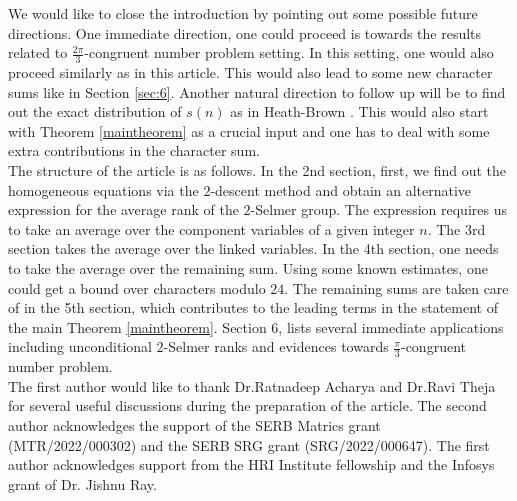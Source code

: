 \documentclass[11pt]{article}
\begin{document}
\noindent We would like to close the introduction by pointing out some possible future directions. One immediate direction, one could proceed is towards the results related to $\frac{2\pi}{3}$-congruent number problem setting. In this setting, one would also proceed similarly as in this article. This would also lead to some new character sums like in Section \ref{sec:6}.  Another natural direction to follow up will be to find out the exact distribution of $s(n)$ as in Heath-Brown \cite{HeathBrown1}.  This would also start with Theorem \ref{maintheorem} as a crucial input and one has to deal with some extra contributions in the character sum. \\


 The structure of the article is as follows.  In the 2nd section,  first, we find out the homogeneous equations via the $2$-descent method and obtain an alternative expression for the average rank of the $2$-Selmer group.  The expression requires us to take an average over the component variables of a given integer $n$.  The 3rd section takes the average over the linked variables.  In the 4th section,  one needs to take the average over the remaining sum.  Using some known estimates, one could get a bound over characters modulo $24$. The remaining sums are taken care of in the 5th section, which contributes to the leading terms in the statement of the main Theorem \ref{maintheorem}.  Section 6,  lists several immediate applications including unconditional $2$-Selmer ranks and evidences towards $\frac{\pi}{3}$-congruent number problem.\\

 The first author would like to thank Dr.Ratnadeep Acharya and Dr.Ravi Theja for several useful discussions during the preparation of the article. The second author acknowledges the support of the SERB Matrics grant (MTR/2022/000302) and the SERB SRG grant (SRG/2022/000647). The first author acknowledges support from the HRI Institute fellowship and the Infosys grant of Dr. Jishnu Ray. 
\end{document}
